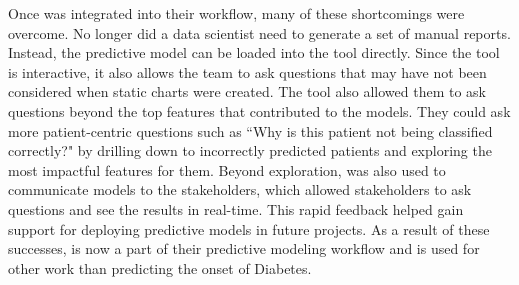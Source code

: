Once \prospector was integrated into their workflow, many of these shortcomings were overcome.  No longer did a data scientist need to generate a set of manual reports.  Instead, the predictive model can be loaded into the tool directly.  Since the tool is interactive, it also allows the team to ask questions that may have not been considered when static charts were created.  The tool also allowed them to ask questions beyond the top features that contributed to the models.  They could ask more patient-centric questions such as ``Why is this patient not being classified correctly?" by drilling down to incorrectly predicted patients and exploring the most impactful features for them. Beyond exploration, \prospector was also used to communicate models to the stakeholders, which allowed stakeholders to ask questions and see the results in real-time.  This rapid feedback helped gain support for deploying predictive models in future projects.  As a result of these successes, \prospector is now a part of their predictive modeling workflow and is used for other work than predicting the onset of Diabetes.




